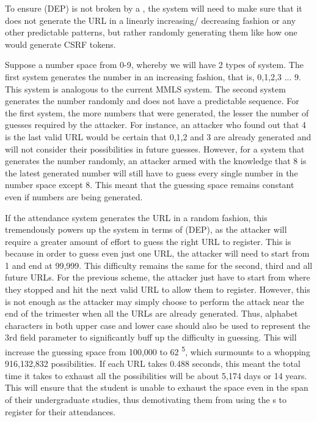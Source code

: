 \documentclass[runningheads]{llncs}
\begin{document}
To ensure (DEP) is not broken by a \scanattack{}, the system will need to make sure that it does not generate the URL in a linearly increasing/ decreasing fashion or any other predictable patterns, but rather randomly generating them like how one would generate CSRF tokens. 

Suppose a number space from 0-9, whereby we will have 2 types of system. The first system generates the number in an increasing fashion, that is, 0,1,2,3 ... 9. This system is analogous to the current MMLS system. The second system generates the number randomly and does not have a predictable sequence. For the first system, the more numbers that were generated, the lesser the number of guesses required by the attacker. For instance, an attacker who found out that 4 is the last valid URL would be certain that 0,1,2 and 3 are already generated and will not consider their possibilities in future guesses. However, for a system that generates the number randomly, an attacker armed with the knowledge that 8 is the latest generated number will still have to guess every single number in the number space except 8. This meant that the guessing space remains constant even if numbers are being generated.

If the attendance system generates the URL in a random fashion, this tremendously powers up the system in terms of (DEP), as the attacker will require a greater amount of effort to guess the right URL to register. This is because in order to guess even just one URL, the attacker will need to start from 1 and end at 99,999. This difficulty remains the same for the second, third and all future URLs. For the previous scheme, the attacker just have to start from where they stopped and hit the next valid URL to allow them to register. However, this is not enough as the attacker may simply choose to perform the attack near the end of the trimester when all the URLs are already generated. Thus, alphabet characters in both upper case and lower case should also be used to represent the 3rd field parameter to significantly buff up the difficulty in guessing. This will increase the guessing space from 100,000 to 62 \textsuperscript{5}, which surmounts to a whopping 916,132,832 possibilities. If each URL takes 0.488 seconds, this meant the total time it takes to exhaust all the possibilities will be about 5,174 days or 14 years. This will ensure that the student is unable to exhaust the space even in the span of their undergraduate studies, thus demotivating them from using the  \scanattack{}s to register for their attendances.
\end{document}
